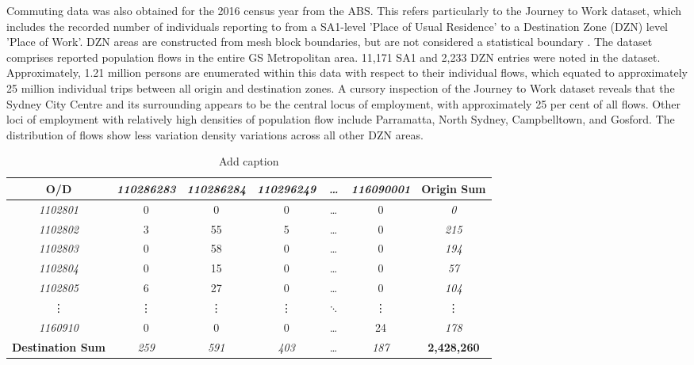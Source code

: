 Commuting data was also obtained for the 2016 census year from the ABS. This refers particularly to the Journey to Work dataset, which includes the recorded number of individuals reporting to from a SA1-level 'Place of Usual Residence' to a Destination Zone (DZN) level 'Place of Work'. DZN areas are constructed from mesh block boundaries, but are not considered a statistical boundary \citep{abs_2016}. The dataset comprises reported population flows in the entire GS Metropolitan area. 11,171 SA1 and 2,233 DZN entries were noted in the dataset. Approximately, 1.21 million persons are enumerated within this data with respect to their individual flows, which equated to approximately 25 million individual trips between all origin and destination zones. A cursory inspection of the Journey to Work dataset reveals that the Sydney City Centre and its surrounding appears to be the central locus of employment, with approximately 25 per cent of all flows. Other loci of employment with relatively high densities of population flow include Parramatta, North Sydney, Campbelltown, and Gosford. The distribution of flows show less variation density variations across all other DZN areas. \\

\renewcommand{\baselinestretch}{0.8}
\begin{table}[!ht]
  \centering \small
    \begin{tabular}{c|ccccc|c}
    \textbf{O/D} & \textit{110286283} & \textit{110286284} & \textit{110296249} & \textit{\ldots} & \textit{116090001} & \multicolumn{1}{l}{\textbf{Origin Sum}} \\
    \midrule
    \textit{1102801} & 0     & 0     & 0     & \ldots & 0     & \textit{0} \\
    \textit{1102802} & 3     & 55    & 5     & \ldots & 0     & \textit{215} \\
    \textit{1102803} & 0     & 58    & 0     & \ldots & 0     & \textit{194} \\
    \textit{1102804} & 0     & 15    & 0     & \ldots & 0     & \textit{57} \\
    \textit{1102805} & 6     & 27    & 0     & \ldots & 0     & \textit{104} \\
    \vdots & \vdots & \vdots & \vdots & $\ddots$ & \vdots & \vdots \\
    \textit{1160910} & 0     & 0     & 0     & \ldots & 24    & \textit{178} \\
    \midrule
    \textbf{Destination Sum} & \textit{259} & \textit{591} & \textit{403} & \ldots & \textit{187} & \textbf{2,428,260} \\
    \end{tabular}
    \caption{Add caption} \label{tod_flows}
\end{table}%

